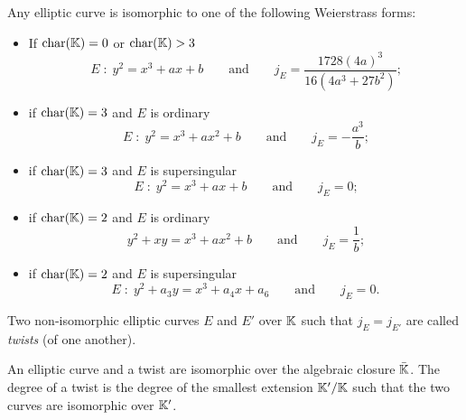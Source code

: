 \begin{proposition}
  \label{th:simplified-weierstrass}
  Any elliptic curve is isomorphic to one of the following Weierstrass
  forms:
  \begin{itemize}
  \item If $\operatorname{char}(\mathbb{K})=0$ or $\operatorname{char}(\mathbb{K})>3$
    \begin{equation}
      \label{eq:weierstrass>3}
      E\;:\;y^2 = x^3 + ax + b 
      \qquad\text{and}\qquad
      j_E = \frac{1728(4a)^3}{16(4a^3 + 27b^2)}
      \text{;}
    \end{equation}
  \item if $\operatorname{char}(\mathbb{K})=3$ and $E$ is ordinary
    \begin{equation}
      \label{eq:weierstrass=3}
      E\;:\;y^2 = x^3 + ax^2 + b
      \qquad\text{and}\qquad
      j_E = -\frac{a^3}{b}
      \text{;}
    \end{equation}
  \item if $\operatorname{char}(\mathbb{K})=3$ and $E$ is supersingular
    \begin{equation}
      \label{eq:136}
      E\;:\;y^2=x^3 + ax+b
      \qquad\text{and}\qquad
      j_E=0
      \text{;}
    \end{equation}
  \item if $\operatorname{char}(\mathbb{K})=2$ and $E$ is ordinary
    \begin{equation}
      \label{eq:weierstrass=2}
      y^2 + xy = x^3 + ax^2 + b
      \qquad\text{and}\qquad
      j_E = \frac{1}{b}
      \text{;}
    \end{equation}
  \item if $\operatorname{char}(\mathbb{K})=2$ and $E$ is supersingular
    \begin{equation}
      \label{eq:137}
      E\;:\; y^2 + a_3y = x^3 + a_4x + a_6
      \qquad\text{and}\qquad
      j_E = 0
      \text{.}
    \end{equation}
  \end{itemize}
\end{proposition}

\begin{definition}[Twist]
  Two non-isomorphic elliptic curves $E$ and $E'$ over $\mathbb{K}$ such that
  $j_E=j_{E'}$ are called \emph{twists} (of one another).
\end{definition}

  An
elliptic curve and a twist are isomorphic over the algebraic closure
$\bar{\mathbb{K}}$. The degree of a twist is the
degree of the smallest extension $\mathbb{K}'/\mathbb{K}$ such that the two curves are
isomorphic over $\mathbb{K}'$.

